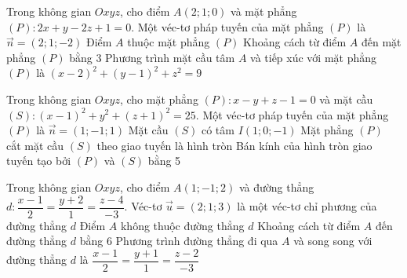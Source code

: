 \begin{ex}%
Trong không gian $Oxyz$, cho điểm $A(2;1;0)$ và mặt phẳng $(P)\colon 2x+y-2z+1=0$.
	\choiceTF
	{\True Một véc-tơ pháp tuyến của mặt phẳng $(P)$ là $\vec{n}=(2;1;-2)$}
	{Điểm $A$ thuộc mặt phẳng $(P)$}
	{Khoảng cách từ điểm $A$ đến mặt phẳng $(P)$ bằng 3}
	{\True Phương trình mặt cầu tâm $A$ và tiếp xúc với mặt phẳng $(P)$ là $(x-2)^2+(y-1)^2+z^2=9$}

\end{ex}
\begin{ex}%
	Trong không gian $Oxyz$, cho mặt phẳng $(P)\colon x-y+z-1=0$ và mặt cầu $(S)\colon (x-1)^2+y^2+(z+1)^2=25$.
	\choiceTF
	{\True Một véc-tơ pháp tuyến của mặt phẳng $(P)$ là $\vec{n}=\left(1;-1;1\right)$}
	{\True Mặt cầu $(S)$ có tâm $I\left(1;0;-1\right)$}
	{\True Mặt phẳng $(P)$ cắt mặt cầu $(S)$ theo giao tuyến là hình tròn}
	{Bán kính của hình tròn giao tuyến tạo bởi $(P)$ và $(S)$ bằng 5}
\end{ex}
\begin{ex}%
	Trong không gian $Oxyz$, cho điểm $A(1;-1;2)$ và đường thẳng $d:\dfrac{x-1}{2}=\dfrac{y+2}{1}=\dfrac{z-4}{-3}$.
	\choiceTF
	{Véc-tơ $\vec{u}=(2;1;3)$ là một véc-tơ chỉ phương của đường thẳng $d$}
	{\True Điểm $A$ không thuộc đường thẳng $d$}
	{Khoảng cách từ điểm $A$ đến đường thẳng $d$ bằng 6}
	{\True Phương trình đường thẳng đi qua $A$ và song song với đường thẳng $d$ là $\dfrac{x-1}{2}=\dfrac{y+1}{1}=\dfrac{z-2}{-3}$}
	
\end{ex}
